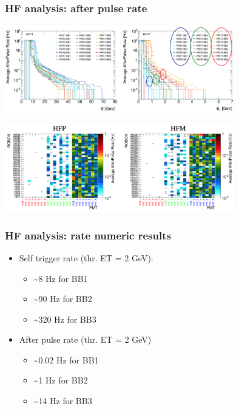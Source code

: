 \documentclass[bigger]{beamer}
\begin{document}
\begin{frame}
\frametitle{HF analysis: after pulse rate}
\label{sec-3-2-5}
\label{sec-3-2-5-1}

\centering
\includegraphics[width=0.75\textwidth]{fig/hf_local/after_pulse_1.png}
\label{sec-3-2-5-2}

\centering
\includegraphics[width=0.75\textwidth]{fig/hf_local/after_pulse_2.png}
\end{frame}
\begin{frame}
\frametitle{HF analysis: rate numeric results}
\label{sec-3-2-6}
\begin{itemize}

\item Self trigger rate (thr. ET = 2 GeV):
\label{sec-3-2-6-1}%
\begin{itemize}

\item \~{}8 Hz for BB1
\label{sec-3-2-6-1-1}%

\item \~{}90 Hz for BB2
\label{sec-3-2-6-1-2}%

\item \~{}320 Hz for BB3
\label{sec-3-2-6-1-3}%
\end{itemize} %

\item After pulse rate (thr. ET = 2 GeV)
\label{sec-3-2-6-2}%
\begin{itemize}

\item \~{}0.02 Hz for BB1
\label{sec-3-2-6-2-1}%

\item \~{}1 Hz for BB2
\label{sec-3-2-6-2-2}%

\item \~{}14 Hz for BB3
\label{sec-3-2-6-2-3}%
\end{itemize} %
\end{itemize} %
\end{frame}
\end{document}

